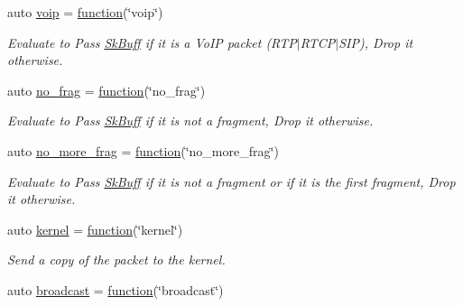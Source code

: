 \begin{DoxyCompactItemize}
auto \hyperlink{namespacepfq_1_1lang_1_1anonymous__namespace_02default_8hpp_03_a814df3093ef905eedf9a9add4c625147}{voip} = \hyperlink{namespacepfq_1_1lang_a1a4638059d700ae08d0ca63886ff2bb3}{function}(\char`\"{}voip\char`\"{})
\begin{DoxyCompactList}\small\item\em Evaluate to {\ttfamily Pass} \hyperlink{structpfq_1_1lang_1_1SkBuff}{Sk\+Buff} if it is a Vo\+IP packet (R\+T\+P$\vert$\+R\+T\+C\+P$\vert$\+S\+IP), {\ttfamily Drop} it otherwise. \end{DoxyCompactList}\item 
auto \hyperlink{namespacepfq_1_1lang_1_1anonymous__namespace_02default_8hpp_03_a4cfaf018f687a1563161b8f4245a6652}{no\+\_\+frag} = \hyperlink{namespacepfq_1_1lang_a1a4638059d700ae08d0ca63886ff2bb3}{function}(\char`\"{}no\+\_\+frag\char`\"{})
\begin{DoxyCompactList}\small\item\em Evaluate to {\ttfamily Pass} \hyperlink{structpfq_1_1lang_1_1SkBuff}{Sk\+Buff} if it is not a fragment, {\ttfamily Drop} it otherwise. \end{DoxyCompactList}\item 
auto \hyperlink{namespacepfq_1_1lang_1_1anonymous__namespace_02default_8hpp_03_a88628ce70e2a650af1338851373b9891}{no\+\_\+more\+\_\+frag} = \hyperlink{namespacepfq_1_1lang_a1a4638059d700ae08d0ca63886ff2bb3}{function}(\char`\"{}no\+\_\+more\+\_\+frag\char`\"{})
\begin{DoxyCompactList}\small\item\em Evaluate to {\ttfamily Pass} \hyperlink{structpfq_1_1lang_1_1SkBuff}{Sk\+Buff} if it is not a fragment or if it is the first fragment, {\ttfamily Drop} it otherwise. \end{DoxyCompactList}\item 
auto \hyperlink{namespacepfq_1_1lang_1_1anonymous__namespace_02default_8hpp_03_a93294225145f96c6aa6cf0cedfa19103}{kernel} = \hyperlink{namespacepfq_1_1lang_a1a4638059d700ae08d0ca63886ff2bb3}{function}(\char`\"{}kernel\char`\"{})
\begin{DoxyCompactList}\small\item\em Send a copy of the packet to the kernel. \end{DoxyCompactList}\item 
auto \hyperlink{namespacepfq_1_1lang_1_1anonymous__namespace_02default_8hpp_03_ac9e0f3ad7fa32146565f4aaab709d19d}{broadcast} = \hyperlink{namespacepfq_1_1lang_a1a4638059d700ae08d0ca63886ff2bb3}{function}(\char`\"{}broadcast\char`\"{})

\end{DoxyCompactItemize}
